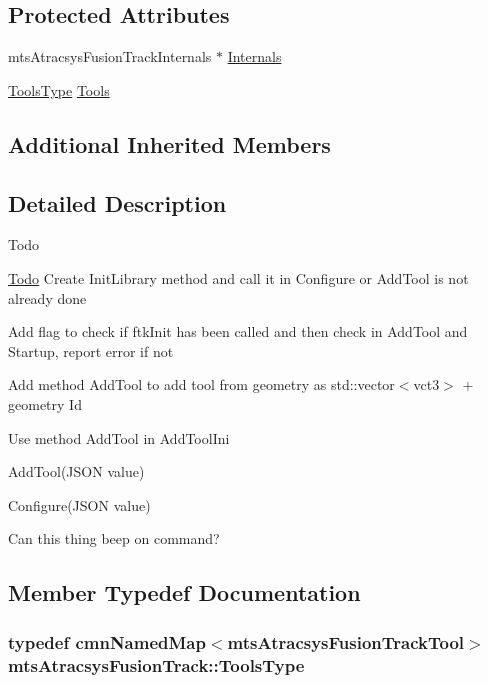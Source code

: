 \subsection*{Protected Attributes}
\begin{DoxyCompactItemize}
\item 
mts\+Atracsys\+Fusion\+Track\+Internals $\ast$ \hyperlink{classmts_atracsys_fusion_track_a2bdd364a64be4962039fad4b810e7997}{Internals}
\item 
\hyperlink{classmts_atracsys_fusion_track_a2c58e85f9c00731a4b06b57142177ba1}{Tools\+Type} \hyperlink{classmts_atracsys_fusion_track_a1d04ed198c5523f65f43758ff7fb7813}{Tools}
\end{DoxyCompactItemize}
\subsection*{Additional Inherited Members}


\subsection{Detailed Description}
\begin{DoxyRefDesc}{Todo}
\item[\hyperlink{todo__todo000013}{Todo}]Create Init\+Library method and call it in Configure or Add\+Tool is not already done 

Add flag to check if ftk\+Init has been called and then check in Add\+Tool and Startup, report error if not 

Add method Add\+Tool to add tool from geometry as std\+::vector$<$vct3$>$ + geometry Id 

Use method Add\+Tool in Add\+Tool\+Ini 

Add\+Tool(\+J\+S\+O\+N value) 

Configure(\+J\+S\+O\+N value) 

Can this thing beep on command? \end{DoxyRefDesc}


\subsection{Member Typedef Documentation}
\hypertarget{classmts_atracsys_fusion_track_a2c58e85f9c00731a4b06b57142177ba1}{}
\subsubsection[{Tools\+Type}]{\setlength{\rightskip}{0pt plus 5cm}typedef {\bf cmn\+Named\+Map}$<$mts\+Atracsys\+Fusion\+Track\+Tool$>$ {\bf mts\+Atracsys\+Fusion\+Track\+::\+Tools\+Type}\hspace{0.3cm}{\ttfamily [protected]}}\label{classmts_atracsys_fusion_track_a2c58e85f9c00731a4b06b57142177ba1}


